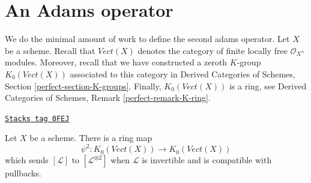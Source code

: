 \section{An Adams operator}
\label{chow-section-adams}
We do the minimal amount of work to define the second adams operator.
Let $X$ be a scheme. Recall that $\textit{Vect}(X)$ denotes the
category of finite locally free $\mathcal{O}_X$-modules.
Moreover, recall that we have constructed a zeroth $K$-group
$K_0(\textit{Vect}(X))$ associated to this category in
Derived Categories of Schemes, Section \ref{perfect-section-K-groups}.
Finally, $K_0(\textit{Vect}(X))$ is a ring, see
Derived Categories of Schemes, Remark \ref{perfect-remark-K-ring}.

\begin{lemma}
\label{chow-lemma-second-adams-operator}
\href{https://stacks.math.columbia.edu/tag/0FEJ}{\texttt{Stacks tag 0FEJ}}

Let $X$ be a scheme. There is a ring map
$$
\psi^2 :
K_0(\textit{Vect}(X))
\longrightarrow
K_0(\textit{Vect}(X))
$$
which sends $[\mathcal{L}]$ to $[\mathcal{L}^{\otimes 2}]$
when $\mathcal{L}$ is invertible and is compatible with pullbacks.
\end{lemma}

